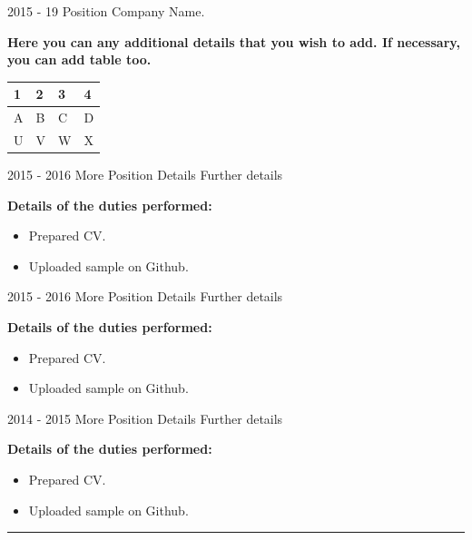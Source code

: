 \documentclass[11pt]{anirudhcv}
\begin{document}
\begin{entrylist}
	\entry
	{2015 - 19}
	{Position}
	{Company Name.}
	{%
		\newline
		\textbf{Here you can any additional details that you wish to add. If necessary, you can add table too.}\vspace{1em}\newline
		\addtolength\tabcolsep{3pt}\renewcommand{\arraystretch}{1.25}\begin{tabular}{|C{1.5cm}|C{2cm}|C{6cm}|C{3.5cm}|}\hline
			\textbf{1} & \textbf{2} & \textbf{3} & \textbf{4} \\\hline
			A & B  & C & D \\\hline
			U & V  & W & X\\\hline
		\end{tabular}%
	}
    \entry 
    {2015 - 2016}
    {More Position Details}
    {Further details}
	{%
	\newline
	\textbf{Details of the duties performed:}
	\begin{itemize}
		\item Prepared CV.
		\item Uploaded sample on Github.
\end{itemize}}
    \entry 
{2015 - 2016}
{More Position Details}
{Further details}
{%
	\newline
	\textbf{Details of the duties performed:}
	\begin{itemize}
		\item Prepared CV.
		\item Uploaded sample on Github.
\end{itemize}}
    \entry 
{2014 - 2015}
{More Position Details}
{Further details}
{%
	\newline
	\textbf{Details of the duties performed:}
	\begin{itemize}
		\item Prepared CV.
		\item Uploaded sample on Github.
\end{itemize}}
\end{entrylist}


\noindent\color{black}\rule{0.81\paperwidth}{0.5ex}
\newline
{}\hfill{}
\end{document}
